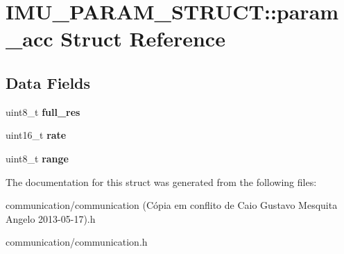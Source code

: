 \hypertarget{structIMU__PARAM__STRUCT_1_1param__acc}{
\section{IMU\_\-PARAM\_\-STRUCT::param\_\-acc Struct Reference}
\label{structIMU__PARAM__STRUCT_1_1param__acc}
}
\subsection*{Data Fields}
\begin{DoxyCompactItemize}
\item 
\hypertarget{structIMU__PARAM__STRUCT_1_1param__acc_af57da5d956ffa7e49a184326b6b9c738}{
uint8\_\-t {\bfseries full\_\-res}}
\label{structIMU__PARAM__STRUCT_1_1param__acc_af57da5d956ffa7e49a184326b6b9c738}

\item 
\hypertarget{structIMU__PARAM__STRUCT_1_1param__acc_a30e6a318cad098cd8379416705820f95}{
uint16\_\-t {\bfseries rate}}
\label{structIMU__PARAM__STRUCT_1_1param__acc_a30e6a318cad098cd8379416705820f95}

\item 
\hypertarget{structIMU__PARAM__STRUCT_1_1param__acc_a26199b298ef2d353192dfbc706bce8cf}{
uint8\_\-t {\bfseries range}}
\label{structIMU__PARAM__STRUCT_1_1param__acc_a26199b298ef2d353192dfbc706bce8cf}

\end{DoxyCompactItemize}


The documentation for this struct was generated from the following files:\begin{DoxyCompactItemize}
\item 
communication/communication (Cópia em conflito de Caio Gustavo Mesquita Angelo 2013-\/05-\/17).h\item 
communication/communication.h\end{DoxyCompactItemize}
